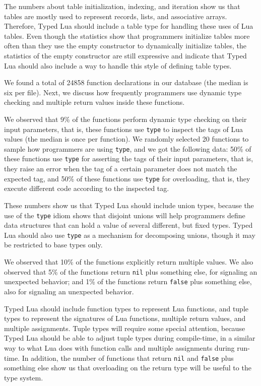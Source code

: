 The numbers about table initialization, indexing, and iteration
show us that tables are mostly used to represent records, lists,
and associative arrays.
Therefore, Typed Lua should include a table type for handling
these uses of Lua tables.
Even though the statistics show that programmers initialize tables
more often than they use the empty constructor to
dynamically initialize tables, the statistics of the empty
constructor are still expressive and indicate that Typed Lua should
also include a way to handle this style of defining table types.

We found a total of 24858 function declarations in our database
(the median is six per file).
Next, we discuss how frequently programmers use dynamic type
checking and multiple return values inside these functions.

We observed that 9\% of the functions perform dynamic type checking
on their input parameters, that is, these functions use \texttt{type}
to inspect the tags of Lua values (the median is once per function).
We randomly selected 20 functions to sample how programmers are
using \texttt{type}, and we got the following data:
50\% of these functions use \texttt{type} for asserting the tags of
their input parameters, that is, they raise an error when the tag of a
certain parameter does not match the expected tag, and
50\% of these functions use \texttt{type} for overloading, that is,
they execute different code according to the inspected tag.

These numbers show us that Typed Lua should include union types,
because the use of the \texttt{type} idiom shows that disjoint unions
will help programmers define data structures that can hold a value of
several different, but fixed types.
Typed Lua should also use \texttt{type} as a mechanism for decomposing
unions, though it may be restricted to base types only.

We observed that 10\% of the functions explicitly return multiple
values.
We also observed that 5\% of the functions return \texttt{nil} plus
something else, for signaling an unexpected behavior;
and 1\% of the functions return \texttt{false} plus something else,
also for signaling an unexpected behavior.

Typed Lua should include function types to represent Lua functions,
and tuple types to represent the signatures of Lua functions,
multiple return values, and multiple assignments.
Tuple types will require some special attention, because Typed Lua
should be able to adjust tuple types during compile-time, in a
similar way to what Lua does with function calls and multiple
assignments during run-time.
In addition, the number of functions that return \texttt{nil} and
\texttt{false} plus something else show us that overloading on the
return type will be useful to the type system.


